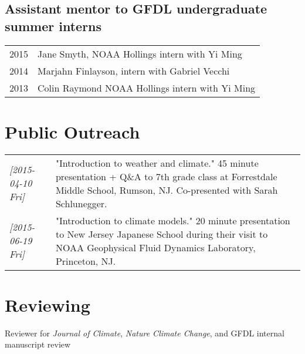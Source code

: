 \documentclass{article}
\begin{document}
\subsection*{Assistant mentor to GFDL undergraduate summer interns}
\label{sec:orgheadline13}
\begin{center}
\begin{tabularx}{\textwidth}{lX}
2015 & Jane Smyth, NOAA Hollings intern with Yi Ming\\
2014 & Marjahn Finlayson, intern with Gabriel Vecchi\\
2013 & Colin Raymond NOAA Hollings intern with Yi Ming\\
\end{tabularx}
\end{center}
\section*{Public Outreach}
\label{sec:orgheadline15}
\begin{center}
\begin{tabularx}{\textwidth}{lX}
\textit{[2015-04-10 Fri]} & "Introduction to weather and climate."  45 minute presentation + Q\&A to 7th grade class at Forrestdale Middle School, Rumson, NJ.  Co-presented with Sarah Schlunegger.\\
\textit{[2015-06-19 Fri]} & "Introduction to climate models."  20 minute presentation to New Jersey Japanese School during their visit to NOAA Geophysical Fluid Dynamics Laboratory, Princeton, NJ.\\
\end{tabularx}
\end{center}
\section*{Reviewing}
\label{sec:orgheadline16}
Reviewer for \emph{Journal of Climate}, \emph{Nature Climate Change}, and GFDL internal
manuscript review
\end{document}
